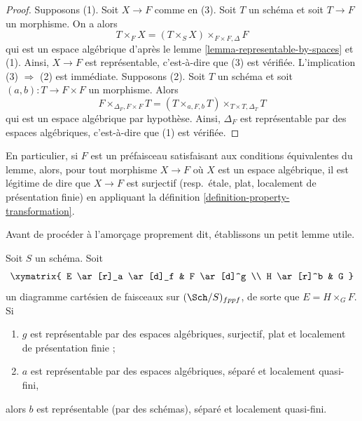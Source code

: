 \begin{proof}
Supposons (1). Soit $X \to F$ comme en (3). Soit $T$ un schéma et soit
$T \to F$ un morphisme. On a alors
$$
T \times_F X = (T \times_S X) \times_{F \times F, \Delta} F
$$
qui est un espace algébrique d'après le
lemme \ref{lemma-representable-by-spaces}
et (1). Ainsi, $X \to F$ est représentable, c'est-à-dire que (3) est vérifiée.
L'implication (3) $\Rightarrow$ (2) est immédiate. Supposons (2).
Soit $T$ un schéma et soit $(a, b) : T \to F \times F$ un morphisme.
Alors
$$
F \times_{\Delta_F, F \times F} T =
(T \times_{a, F, b} T) \times_{T \times T, \Delta_T} T
$$
qui est un espace algébrique par hypothèse. Ainsi, $\Delta_F$ est
représentable par des espaces algébriques, c'est-à-dire que (1) est vérifiée.
\end{proof}

\noindent
En particulier, si $F$ est un préfaisceau satisfaisant aux conditions équivalentes du
lemme, alors, pour tout morphisme $X \to F$ où $X$ est un espace algébrique,
il est légitime de dire que $X \to F$ est surjectif (resp.\ étale, plat,
localement de présentation finie) en appliquant la
définition \ref{definition-property-transformation}.

\medskip\noindent
Avant de procéder à l'amorçage proprement dit, établissons un petit lemme utile.

\begin{lemma}
\label{lemma-after-fppf-sep-lqf}
Soit $S$ un schéma.
Soit
$$
\xymatrix{
E \ar[r]_a \ar[d]_f & F \ar[d]^g \\
H \ar[r]^b & G
}
$$
un diagramme cartésien de faisceaux sur $(\Sch/S)_{fppf}$, de sorte que
$E = H \times_G F$. Si
\begin{enumerate}
\item $g$ est représentable par des espaces algébriques, surjectif, plat et
localement de présentation finie ;
\item $a$ est représentable par des espaces algébriques, séparé et
localement quasi-fini,
\end{enumerate}
alors $b$ est représentable (par des schémas), séparé et
localement quasi-fini.
\end{lemma}

